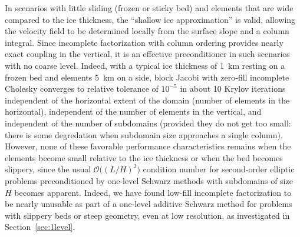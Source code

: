 \documentclass[draft,lineno,jgrga]{AGUTeX}
\newcommand{\bigO}{{\mathcal{O}}}
\begin{document}
\begin{article}
In scenarios with little sliding (frozen or sticky bed) and elements that are wide compared to the ice thickness, the ``shallow ice approximation'' is valid, allowing the velocity field to be determined locally from the surface slope and a column integral.
Since incomplete factorization with column ordering provides nearly exact coupling in the vertical,
it is an effective preconditioner in such scenarios with no coarse level.  Indeed, with a typical
ice thickness of \SI{1}{\kilo\metre} resting on a frozen bed and elements \SI{5}{\kilo\metre} on
a side, block Jacobi with zero-fill incomplete Cholesky converges to relative tolerance of $10^{-5}$
in about 10 Krylov iterations independent of the horizontal extent of the domain (number of elements
in the horizontal), independent of the number of elements in the vertical, and independent of the
number of subdomains (provided they do not get too small: there is some degredation when subdomain
size approaches a single column).  However, none of these favorable performance characteristics
remains when the elements become small relative to the ice thickness or when the bed becomes
slippery, since the usual $\bigO\big((L/H)^2\big)$ condition number for second-order elliptic problems
preconditioned by one-level Schwarz methods with subdomains of size $H$ \citep[see][]{smith1996domain} becomes apparent.
Indeed, we have found low-fill incomplete factorization to be nearly unusable as part of a one-level additive Schwarz method for problems with slippery beds or steep geometry, even at low resolution, as investigated in Section~\ref{sec:1level}.


\end{article}
\end{document}
